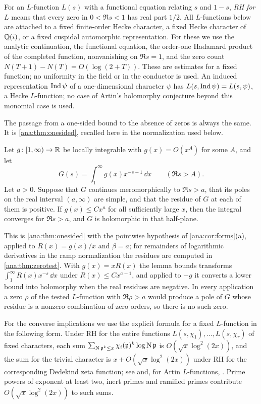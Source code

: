 For an $L$-function $L(s)$ with a functional equation relating $s$ and $1-s$, \emph{RH for $L$} means that
every zero in $0<\Re s<1$ has real part $1/2$. All $L$-functions below are attached to a fixed finite-order
Hecke character, a fixed Hecke character of $\mathbb{Q}(i)$, or a fixed cuspidal automorphic representation.
For these we use the analytic continuation, the functional equation, the order-one Hadamard product of the
completed function, nonvanishing on $\Re s=1$, and the zero count $N(T+1)-N(T)=O(\log(2+T))$. These are
estimates for a fixed function; no uniformity in the field or in the conductor is used. An induced
representation $\operatorname{Ind}\psi$ of a one-dimensional character $\psi$ has $L(s,\operatorname{Ind}\psi)=L(s,\psi)$, a Hecke
$L$-function; no case of Artin's holomorphy conjecture beyond this monomial case is used.

The passage from a one-sided bound to the absence of zeros is always the same. It is
\cref{ana:thm:onesided}, recalled here in the normalization used below.

\begin{lemma}\label{hec:lem:landau}
Let $g\colon[1,\infty)\to\mathbb{R}$ be locally integrable with $g(x)=O(x^{A})$ for some $A$, and let
\[
 G(s)=\int_1^\infty g(x)x^{-s-1}\,\dd x\qquad(\Re s>A).
\]
Let $a>0$. Suppose that $G$ continues meromorphically to $\Re s>a$, that its poles on the real interval
$(a,\infty)$ are simple, and that the residue of $G$ at each of them is positive. If
$g(x)\le Cx^{a}$ for all sufficiently large $x$, then the integral converges for $\Re s>a$, and $G$ is
holomorphic in that half-plane.
\end{lemma}

This is \cref{ana:thm:onesided} with the pointwise hypothesis of \cref{ana:cor:forms}(a), applied to
$R(x)=g(x)/x$ and $\beta=a$; for remainders of logarithmic derivatives in the ramp normalization the
residues are computed in \cref{ana:thm:zerotest}. With $g(x)=xR(x)$ the lemma bounds transforms
$\int_1^\infty R(x)x^{-s}\,\dd x$ under $R(x)\le Cx^{a-1}$, and applied to $-g$ it converts a lower bound
into holomorphy when the real residues are negative. In every application a zero $\rho$ of the tested
$L$-function with $\Re\rho>a$ would produce a pole of $G$ whose residue is a nonzero combination of zero
orders, so there is no such zero.

For the converse implications we use the explicit formula for a fixed $L$-function in the following form.
Under RH for the entire functions $L(s,\chi_1),\dots,L(s,\chi_r)$ of fixed characters, each sum
$\sum_{\operatorname{N}\mathfrak p^k\le x}\chi_i(\mathfrak p)^k\log\operatorname{N}\mathfrak p$ is $O(\sqrt x\log^2(2x))$, and the
sum for the trivial character is $x+O(\sqrt x\log^2(2x))$ under RH for the corresponding Dedekind zeta
function; see \cite{GrenieMolteni2016Explicit,GrenieMolteni2017Effective} and, for Artin $L$-functions,
\cite[Ch.~3]{Ng2000Limiting}. Prime powers of exponent at least two, inert primes and ramified primes
contribute $O(\sqrt x\log^2(2x))$ to such sums.

